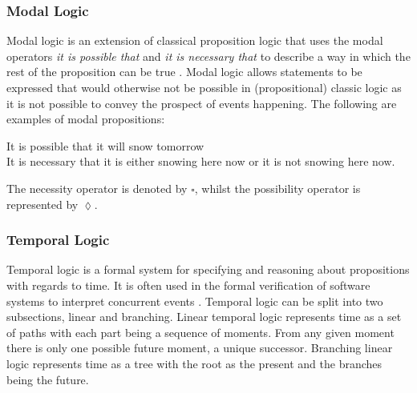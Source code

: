\documentclass[12pt,a4paper]{report}
\newenvironment{tightcenter}{%
  \setlength\topsep{0pt}
  \setlength\parskip{0pt}
  \begin{center}
}{%
  \end{center}
}
\begin{document}
\subsubsection{Modal Logic}
Modal logic is an extension of classical proposition logic that uses the modal operators \textit{it is possible that} and \textit{it is necessary that} to describe a way in which the rest of the proposition can be true  \citep{zalta1988basic}. Modal logic allows statements to be expressed that would otherwise not be possible in (propositional) classic logic as it is not possible to convey the prospect of events happening. The following are examples of modal propositions:

\bigbreak
\begin{tightcenter}
It is possible that it will snow tomorrow\\
It is necessary that it is either snowing here now or it is not snowing here now.\\
\end{tightcenter}
\bigbreak

The necessity operator is denoted by $\square$, whilst the possibility operator is represented by $\lozenge$.

\subsubsection{Temporal Logic}
Temporal logic is a formal system for specifying and reasoning about propositions with regards to time. It is often used in the formal verification of software systems to interpret concurrent events \citep{lamport1983good}. Temporal logic can be split into two subsections, linear and branching. Linear temporal logic represents time as a set of paths with each part being a sequence of moments. From any given moment there is only one possible future moment, a unique successor. Branching linear logic represents time as a tree with the root as the present and the branches being the future.
\end{document}
